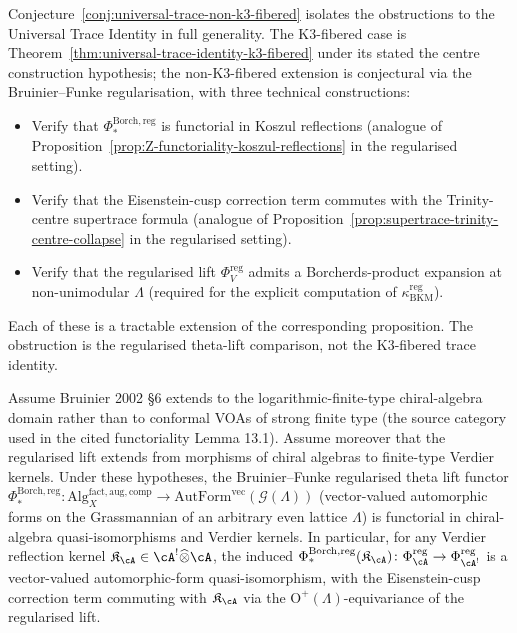 \begin{remark}
\label{rem:non-k3-fibered-obstruction}
Conjecture~\ref{conj:universal-trace-non-k3-fibered} isolates the
obstructions to the Universal Trace Identity in full generality. The
K$3$-fibered case is Theorem~\ref{thm:universal-trace-identity-k3-fibered}
under its stated the centre construction hypothesis; the non-K$3$-fibered extension is
conjectural via the Bruinier--Funke regularisation, with three technical
constructions:
\begin{itemize}
 \item Verify that $\Phi^{\mathrm{Borch}, \mathrm{reg}}_*$ is functorial
 in Koszul reflections \textup{(}analogue of
 Proposition~\ref{prop:Z-functoriality-koszul-reflections} in the
 regularised setting\textup{).}
 \item Verify that the Eisenstein-cusp correction term commutes with the
 Trinity-centre supertrace formula
 \textup{(}analogue of
 Proposition~\ref{prop:supertrace-trinity-centre-collapse} in the
 regularised setting\textup{).}
 \item Verify that the regularised lift $\Phi_V^{\mathrm{reg}}$ admits a
 Borcherds-product expansion at non-unimodular $\Lambda$
 \textup{(}required for the explicit computation of
 $\kappa_{\mathrm{BKM}}^{\mathrm{reg}}$\textup{).}
\end{itemize}
Each of these is a tractable extension of the corresponding
proposition. The obstruction is the regularised theta-lift comparison,
not the K$3$-fibered trace identity.
\end{remark}

\begin{proposition}
\label{prop:bruinier-funke-functoriality}
Assume Bruinier 2002 \S 6 extends to the logarithmic-finite-type
chiral-algebra domain rather than to conformal VOAs of strong finite
type \textup{(}the source category used in the cited functoriality
Lemma 13.1\textup{).} Assume moreover that the regularised lift extends
from morphisms of chiral algebras to finite-type Verdier kernels.
Under these hypotheses,
the Bruinier--Funke regularised theta lift functor
$\Phi^{\mathrm{Borch}, \mathrm{reg}}_* \colon \mathrm{Alg}^{\mathrm{fact, aug, comp}}_X \to
\mathrm{AutForm}^{\mathrm{vec}}(\mathcal{G}(\Lambda))$
\textup{(}vector-valued automorphic forms on the Grassmannian of an
arbitrary even lattice $\Lambda$\textup{)} is functorial in chiral-algebra
quasi-isomorphisms and Verdier kernels. In particular, for any Verdier
reflection kernel
$\mathfrak{K}_\cA \in \cA^! \widehat\otimes \cA$, the induced
$\Phi^{\mathrm{Borch}, \mathrm{reg}}_*(\mathfrak{K}_\cA) \colon
\Phi^{\mathrm{reg}}_\cA \to \Phi^{\mathrm{reg}}_{\cA^!}$ is a vector-valued
automorphic-form quasi-isomorphism, with the Eisenstein-cusp correction
term commuting with $\mathfrak{K}_\cA$ via the
$\mathrm{O}^+(\Lambda)$-equivariance of the regularised lift.
\end{proposition}

